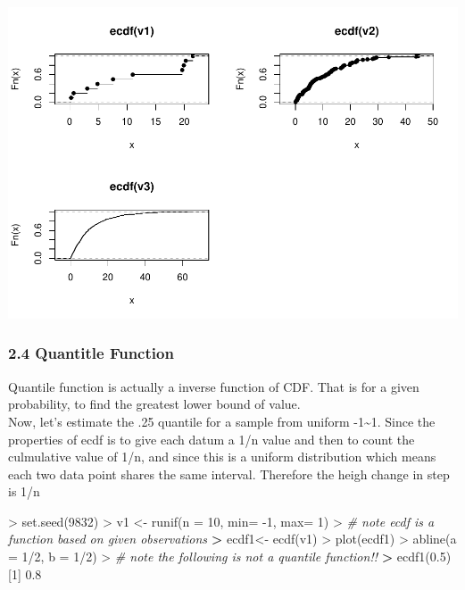 \documentclass[
]{article}
\newenvironment{Shaded}{\begin{snugshade}}{\end{snugshade}}
\newcommand{\AttributeTok}[1]{\textcolor[rgb]{0.77,0.63,0.00}{#1}}
\newcommand{\CommentTok}[1]{\textcolor[rgb]{0.56,0.35,0.01}{\textit{#1}}}
\newcommand{\DecValTok}[1]{\textcolor[rgb]{0.00,0.00,0.81}{#1}}
\newcommand{\ErrorTok}[1]{\textcolor[rgb]{0.64,0.00,0.00}{\textbf{#1}}}
\newcommand{\FloatTok}[1]{\textcolor[rgb]{0.00,0.00,0.81}{#1}}
\newcommand{\FunctionTok}[1]{\textcolor[rgb]{0.00,0.00,0.00}{#1}}
\newcommand{\NormalTok}[1]{#1}
\newcommand{\OtherTok}[1]{\textcolor[rgb]{0.56,0.35,0.01}{#1}}
\newcommand{\SpecialCharTok}[1]{\textcolor[rgb]{0.00,0.00,0.00}{#1}}
\begin{document}
\includegraphics[width=1\linewidth,height=0.5\textheight]{R_Tricks_For_ComputationStats_files/figure-latex/unnamed-chunk-3-1}

\hypertarget{quantitle-function}{%
\subsubsection{2.4 Quantitle Function}\label{quantitle-function}}

Quantile function is actually a inverse function of CDF. That is for a
given probability, to find the greatest lower bound of value.\\
Now, let's estimate the .25 quantile for a sample from uniform
-1\textasciitilde1. Since the properties of ecdf is to give each datum a
1/n value and then to count the culmulative value of 1/n, and since this
is a uniform distribution which means each two data point shares the
same interval. Therefore the heigh change in step is 1/n

\begin{Shaded}
\begin{Highlighting}[]
\SpecialCharTok{\textgreater{}} \FunctionTok{set.seed}\NormalTok{(}\DecValTok{9832}\NormalTok{)}
\SpecialCharTok{\textgreater{}}\NormalTok{ v1 }\OtherTok{\textless{}{-}} \FunctionTok{runif}\NormalTok{(}\AttributeTok{n =} \DecValTok{10}\NormalTok{, }\AttributeTok{min=} \SpecialCharTok{{-}}\DecValTok{1}\NormalTok{, }\AttributeTok{max=} \DecValTok{1}\NormalTok{)}
\SpecialCharTok{\textgreater{}} \CommentTok{\# note ecdf is a function based on given observations}
\ErrorTok{\textgreater{}}\NormalTok{ ecdf1}\OtherTok{\textless{}{-}} \FunctionTok{ecdf}\NormalTok{(v1)}
\SpecialCharTok{\textgreater{}} \FunctionTok{plot}\NormalTok{(ecdf1)}
\SpecialCharTok{\textgreater{}} \FunctionTok{abline}\NormalTok{(}\AttributeTok{a =} \DecValTok{1}\SpecialCharTok{/}\DecValTok{2}\NormalTok{, }\AttributeTok{b =} \DecValTok{1}\SpecialCharTok{/}\DecValTok{2}\NormalTok{)}
\SpecialCharTok{\textgreater{}} \CommentTok{\# note the following is not a quantile function!!}
\ErrorTok{\textgreater{}} \FunctionTok{ecdf1}\NormalTok{(}\FloatTok{0.5}\NormalTok{)}
\NormalTok{[}\DecValTok{1}\NormalTok{] }\FloatTok{0.8}
\end{Highlighting}
\end{Shaded}
\end{document}
